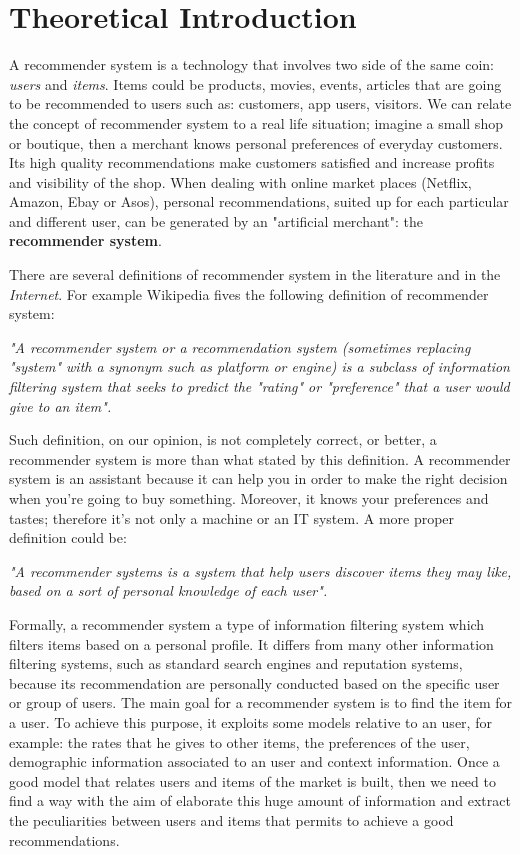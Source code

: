 \section{Theoretical Introduction}

A recommender system is a technology that involves two side of the same coin: \textit{users} and \textit{items}. Items could be products, movies, events, articles that are going to be recommended to users such as: customers, app users, visitors. We can relate the concept of recommender system to a real life situation; imagine a small shop or boutique, then a merchant knows personal preferences of everyday customers. Its high quality recommendations make customers satisfied and increase profits and visibility of the shop. When dealing with online market places (Netflix, Amazon, Ebay or Asos), personal recommendations, suited up for each particular and different user, can be generated by an "artificial merchant": the \textbf{recommender system}.

There are several definitions of recommender system in the literature and in the \textit{Internet}. For example Wikipedia fives the following definition of recommender system: 

\textit{"A recommender system or a recommendation system (sometimes replacing "system" with a synonym such as platform or engine) is a subclass of information filtering system that seeks to predict the "rating" or "preference" that a user would give to an item".}

Such definition, on our opinion, is not completely correct, or better, a recommender system is more than what stated by this definition. A recommender system is an assistant because it can help you in order to make the right decision when you're going to buy something. Moreover, it knows your preferences and tastes; therefore it's not only a machine or an IT system. A more proper definition could be: 

\textit{"A recommender systems is a system that help users discover items they may like, based on a sort of personal knowledge of each user".}

Formally, a recommender system a type of information filtering system which filters items based on a personal profile. It differs from many other information filtering systems, such as standard search engines and reputation systems, because its recommendation are personally conducted based on the specific user or group of users. The main goal for a recommender system is to find the item for a user. To achieve this purpose, it exploits some models relative to an user, for example: the rates that he gives to other items, the preferences of the user, demographic information associated to an user and context information. Once a good model that relates users and items of the market is built, then we need to find a way with the aim of elaborate this huge amount of information and extract the peculiarities between users and items that permits to achieve a good recommendations. 

